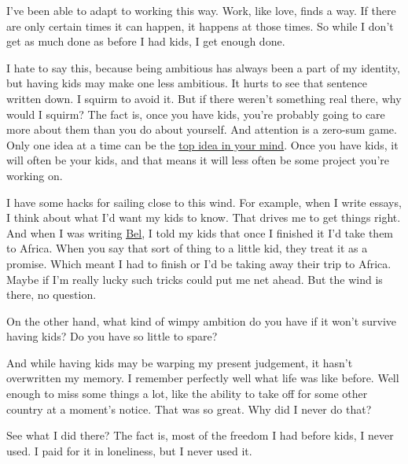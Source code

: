 I've
                  been able to adapt to working this way. Work, like love, finds
                  a way. If there are only certain times it can happen, it
                  happens at those times. So while I don't get as much done as
                  before I had kids, I get enough done.

I hate to say
                  this, because being ambitious has always been a part of my
                  identity, but having kids may make one less ambitious. It
                  hurts to see that sentence written down. I squirm to avoid it.
                  But if there weren't something real there, why would I squirm?
                  The fact is, once you have kids, you're probably going to care
                  more about them than you do about yourself. And attention is a
                  zero-sum game. Only one idea at a time can be the
                  \href{http://www.paulgraham.com/top.html}{\underline{top idea in your mind}}. Once you have kids, it will often be your kids, and that
                  means it will less often be some project you're working on.

I
                  have some hacks for sailing close to this wind. For example,
                  when I write essays, I think about what I'd want my kids to
                  know. That drives me to get things right. And when I was
                  writing \href{http://www.paulgraham.com/bel.html}{\underline{Bel}}, I told my kids that once I finished it I'd take them to
                  Africa. When you say that sort of thing to a little kid, they
                  treat it as a promise. Which meant I had to finish or I'd be
                  taking away their trip to Africa. Maybe if I'm really lucky
                  such tricks could put me net ahead. But the wind is there, no
                  question.

On the other hand, what kind of wimpy
                  ambition do you have if it won't survive having kids? Do you
                  have so little to spare?

And while having kids may
                  be warping my present judgement, it hasn't overwritten my
                  memory. I remember perfectly well what life was like before.
                  Well enough to miss some things a lot, like the ability to
                  take off for some other country at a moment's notice. That was
                  so great. Why did I never do that?

See what I did
                  there? The fact is, most of the freedom I had before kids, I
                  never used. I paid for it in loneliness, but I never used
                  it.

